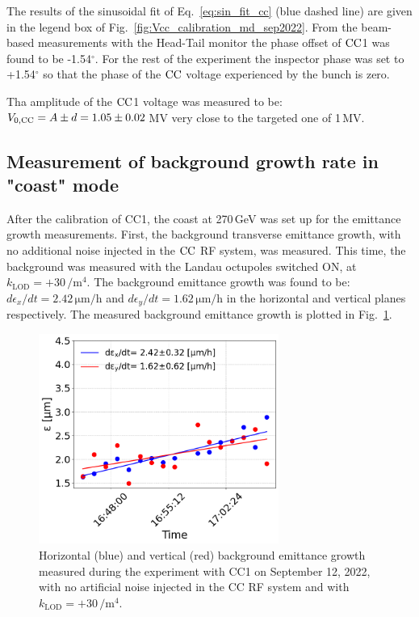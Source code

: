 The results of the sinusoidal fit of Eq.~\eqref{eq:sin_fit_cc} (blue dashed line) are given in the legend box of Fig.~\ref{fig:Vcc_calibration_md_sep2022}. From the beam-based measurements with the Head-Tail monitor the phase offset of ${\mathrm{CC}}$1 was found to be -1.54$^\circ$. For the rest of the experiment the inspector phase was set to +1.54$^\circ$ so that the phase of the ${\mathrm{CC}}$ voltage experienced by the bunch is zero. 

Tha amplitude of the ${\mathrm{CC}}$1 voltage was measured to be: ${V_\mathrm{0, CC}}=A \pm d = 1.05 \pm 0.02$\,MV very close to the targeted one of 1\,MV.

\subsection{Measurement of background growth rate in "coast" mode}
After the calibration of CC1, the coast at 270\,GeV was set up for the emittance growth measurements. First, the background transverse emittance growth, with no additional noise injected in the ${\mathrm{CC}}$ RF system, was measured. This time, the background was measured with the Landau octupoles switched ON, at $k_\mathrm{LOD}=+30$\,$\mathrm{/m^4}$. The background emittance growth was found to be: $d\epsilon_x/dt=2.42$\,$\mathrm{\mu m/h}$ and $d\epsilon_y/dt=1.62$\,$\mathrm{\mu m/h}$ in the horizontal and vertical planes respectively. The measured background emittance growth is plotted in Fig.~\ref{fig:H_V_emit_growth_background_subtracted_octupole_scan_sep22}.


\begin{figure}[!h]
   \centering         
   \includegraphics[width=0.7\textwidth]{images/Ch8/cc_md_12sep22_backg_coast3.png}
       \caption{Horizontal (blue) and vertical (red) background emittance growth measured during the experiment with CC1 on September 12, 2022, with no artificial noise injected in the CC RF system and with $k_\mathrm{LOD}=+30$\,$\mathrm{/m^4}$.}
       \label{fig:H_V_emit_growth_background_subtracted_octupole_scan_sep22}
\end{figure}

